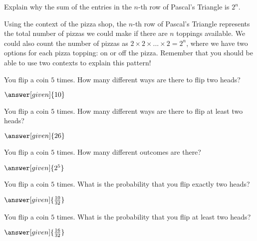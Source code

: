 \documentclass[nooutcomes]{ximera}
\begin{document}
\begin{problem}
Explain why the sum of the entries in the $n$-th row of Pascal's Triangle is $2^n$.
\begin{freeResponse}
	\begin{hint}
		Using the context of the pizza shop, the $n$-th row of Pascal's Triangle represents the total number of pizzas we could make if there are $n$ toppings available.  We could also count the number of pizzas as $2 \times 2 \times ... \times 2 = 2^n$, where we have two options for each pizza topping: on or off the pizza.  Remember that you should be able to use two contexts to explain this pattern!
	\end{hint}
\end{freeResponse}
\end{problem}



\begin{problem}
	You flip a coin $5$ times.  How many different ways are there to flip two heads?
	\begin{prompt}
		$\answer[given]{10}$
	\end{prompt}
\end{problem}

\begin{problem}
	You flip a coin $5$ times.  How many different ways are there to flip at least two heads?
	\begin{prompt}
		$\answer[given]{26}$
	\end{prompt}
\end{problem}


\begin{problem}
	You flip a coin $5$ times.  How many different outcomes are there?
	\begin{prompt}
		$\answer[given]{2^5}$
	\end{prompt}
\end{problem}


\begin{problem}
	You flip a coin $5$ times.  What is the probability that you flip exactly two heads?
	\begin{prompt}
		$\answer[given]{\frac{10}{32}}$
	\end{prompt}
\end{problem}


\begin{problem}
	You flip a coin $5$ times.  What is the probability that you flip at least two heads?
	\begin{prompt}
		$\answer[given]{\frac{16}{32}}$
	\end{prompt}
\end{problem}
\end{document}
